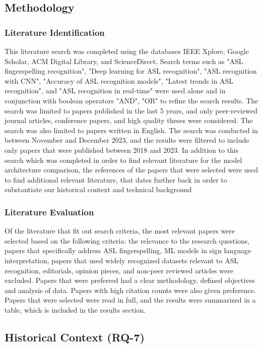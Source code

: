 \subsection{Methodology}

\subsubsection{Literature Identification}
This literature search was completed using the databases IEEE Xplore, Google Scholar, ACM Digital Library, and ScienceDirect. Search terms such as "ASL fingerspelling recognition", "Deep learning for ASL recognition",  "ASL recognition with CNN", "Accuracy of ASL recognition models", "Latest trends in ASL recognition", and "ASL recognition in real-time" were used alone and in conjunction with boolean operators "AND", "OR" to refine the search results. The search was limited to papers published in the last 5 years, and only peer-reviewed journal articles, conference papers, and high quality theses were considered. The search was also limited to papers written in English. The search was conducted in between November and December 2023, and the results were filtered to include only papers that were published between 2018 and 2023.
In addition to this search which was completed in order to find relevant literature for the model architecture comparison, the references of the papers that were selected were used to find additional relevant literature, that dates further back in order to substantiate our historical context and technical background
\subsubsection{Literature Evaluation}
Of the literature that fit out search criteria, the most relevant papers were selected based on the following criteria: the relevance to the research questions, papers that specifically address ASL fingerspelling, ML models in sign language interpretation, papers that used widely recognized datasets relevant to ASL recognition, editorials, opinion pieces, and non-peer reviewed articles were excluded. Papers that were preferred had a clear methodology, defined objectives and analysis of data. Papers with high citation counts were also given preference. Papers that were selected were read in full, and the results were summarized in a table, which is included in the results section.

\subsection{Historical Context (RQ-7)} %

